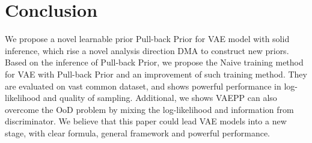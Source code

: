 \section{Conclusion}

We propose a novel learnable prior Pull-back Prior for VAE model with solid inference, which rise a novel analysis direction DMA to construct new priors. Based on the inference of Pull-back Prior, we propose the Naive training method for VAE with Pull-back Prior and an improvement of such training method. They are evaluated  on vast common dataset, and shows powerful performance in log-likelihood and quality of sampling. Additional, we shows VAEPP can also overcome the OoD problem by mixing the log-likelihood and information from discriminator. We believe that this paper could lead VAE models into a new stage, with clear formula, general framework and powerful performance. 